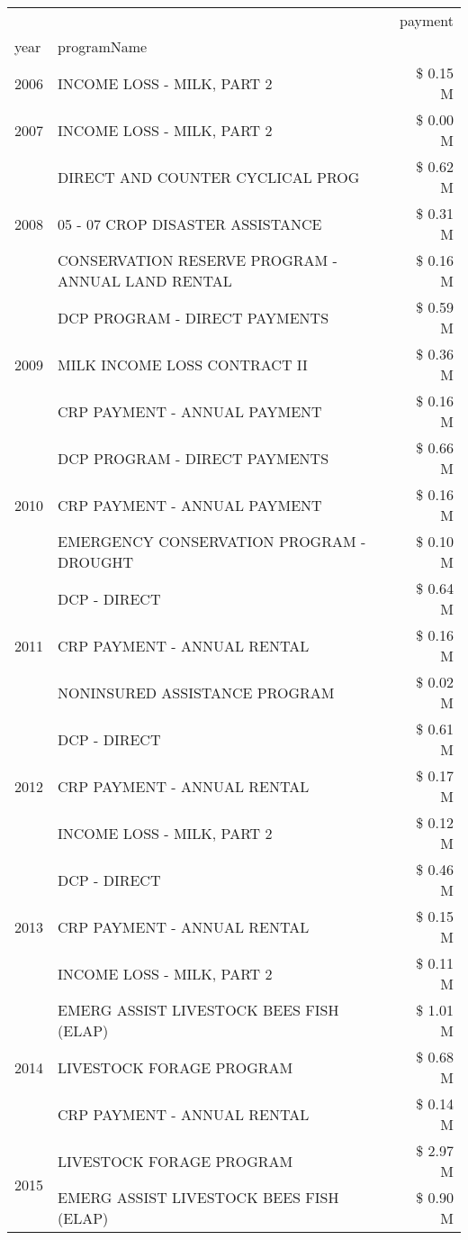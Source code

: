 \begin{tabular}{llr}
\toprule
 &  & payment \\
year & programName &  \\
\midrule
2006 & INCOME LOSS - MILK, PART 2 & \$ 0.15 M \\
\cline{1-3}
2007 & INCOME LOSS - MILK, PART 2 & \$ 0.00 M \\
\cline{1-3}
\multirow[t]{3}{*}{2008} & DIRECT AND COUNTER CYCLICAL PROG & \$ 0.62 M \\
 & 05 - 07 CROP DISASTER ASSISTANCE & \$ 0.31 M \\
 & CONSERVATION RESERVE PROGRAM - ANNUAL LAND RENTAL & \$ 0.16 M \\
\cline{1-3}
\multirow[t]{3}{*}{2009} & DCP PROGRAM - DIRECT PAYMENTS & \$ 0.59 M \\
 & MILK INCOME LOSS CONTRACT II & \$ 0.36 M \\
 & CRP PAYMENT - ANNUAL PAYMENT & \$ 0.16 M \\
\cline{1-3}
\multirow[t]{3}{*}{2010} & DCP PROGRAM - DIRECT PAYMENTS & \$ 0.66 M \\
 & CRP PAYMENT - ANNUAL PAYMENT & \$ 0.16 M \\
 & EMERGENCY CONSERVATION PROGRAM - DROUGHT & \$ 0.10 M \\
\cline{1-3}
\multirow[t]{3}{*}{2011} & DCP - DIRECT & \$ 0.64 M \\
 & CRP PAYMENT - ANNUAL RENTAL & \$ 0.16 M \\
 & NONINSURED ASSISTANCE PROGRAM & \$ 0.02 M \\
\cline{1-3}
\multirow[t]{3}{*}{2012} & DCP - DIRECT & \$ 0.61 M \\
 & CRP PAYMENT - ANNUAL RENTAL & \$ 0.17 M \\
 & INCOME LOSS - MILK, PART 2 & \$ 0.12 M \\
\cline{1-3}
\multirow[t]{3}{*}{2013} & DCP - DIRECT & \$ 0.46 M \\
 & CRP PAYMENT - ANNUAL RENTAL & \$ 0.15 M \\
 & INCOME LOSS - MILK, PART 2 & \$ 0.11 M \\
\cline{1-3}
\multirow[t]{3}{*}{2014} & EMERG ASSIST LIVESTOCK BEES FISH (ELAP) & \$ 1.01 M \\
 & LIVESTOCK FORAGE PROGRAM & \$ 0.68 M \\
 & CRP PAYMENT - ANNUAL RENTAL & \$ 0.14 M \\
\cline{1-3}
\multirow[t]{3}{*}{2015} & LIVESTOCK FORAGE PROGRAM & \$ 2.97 M \\
 & EMERG ASSIST LIVESTOCK BEES FISH (ELAP) & \$ 0.90 M \\

\end{tabular}
